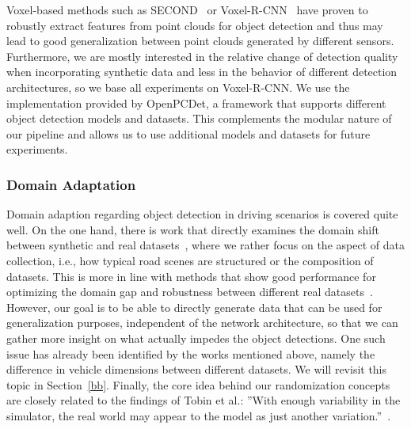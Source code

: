 Voxel-based methods such as SECOND~\cite{yan_second_2018} or Voxel-R-CNN~\cite{deng_voxel_2021} have proven to robustly extract features from point clouds for object detection and thus may lead to good generalization between point clouds generated by different sensors.
Furthermore, we are mostly interested in the relative change of detection quality when incorporating synthetic data and less in the behavior of different detection architectures, so we base all experiments on Voxel-R-CNN.
We use the implementation provided by OpenPCDet\cite{team_openpcdet_2020}, a framework that supports different object detection models and datasets. 
This complements the modular nature of our pipeline and allows us to use additional models and datasets for future experiments.

\subsubsection{Domain Adaptation}
Domain adaption regarding object detection in driving scenarios is covered quite well. On the one hand, there is work that directly examines the domain shift between synthetic and real datasets~\cite{triess_realism_2022,huch_quantifying_2023}, where we rather focus on the aspect of data collection, i.e., how typical road scenes are structured or the composition of datasets.
This is more in line with methods that show good performance for optimizing the domain gap and robustness between different real datasets~\cite{wang_train_2020,yang_st3d_2021,zhang_uni3d_2023}.
However, our goal is to be able to directly generate data that can be used for generalization purposes, independent of the network architecture, so that we can gather more insight on what actually impedes the object detections.
One such issue has already been identified by the works mentioned above, namely the difference in vehicle dimensions between different datasets.
We will revisit this topic in Section~\ref{bb}.
Finally, the core idea behind our randomization concepts are closely related to the findings of Tobin et al.: ”With enough variability in
the simulator, the real world may appear to the model as just
another variation.”~\cite{tobin_domain_2017}. 

